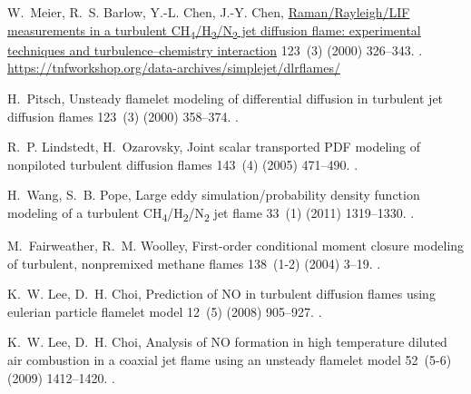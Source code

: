 \documentclass[preprint,12pt, a4paper]{elsarticle}
\begin{document}
\begin{thebibliography}{10}
W.~Meier, R.~S. Barlow, Y.-L. Chen, J.-Y. Chen,
  \href{https://tnfworkshop.org/data-archives/simplejet/dlrflames/}{Raman/{R}ayleigh/{LIF}
  measurements in a turbulent
  {CH}\textsubscript{4}/{H}\textsubscript{2}/{N}\textsubscript{2 }jet diffusion
  flame: experimental techniques and turbulence--chemistry interaction} 123~(3)
  (2000) 326--343.
\newblock \href {http://dx.doi.org/10.1016/S0010-2180(00)00171-1}
  {}.
\newline\urlprefix\url{https://tnfworkshop.org/data-archives/simplejet/dlrflames/}

H.~Pitsch, Unsteady flamelet modeling of differential diffusion in turbulent
  jet diffusion flames 123~(3) (2000) 358--374.
\newblock \href {http://dx.doi.org/10.1016/S0010-2180(00)00135-8}
  {}.

R.~P. Lindstedt, H.~Ozarovsky, Joint scalar transported {PDF} modeling of
  nonpiloted turbulent diffusion flames 143~(4) (2005) 471--490.
\newblock \href {http://dx.doi.org/10.1016/j.combustflame.2005.08.030}
  {}.

H.~Wang, S.~B. Pope, Large eddy simulation/probability density function
  modeling of a turbulent
  {CH}\textsubscript{4}/{H}\textsubscript{2}/{N}\textsubscript{2} jet flame
  33~(1) (2011) 1319--1330.
\newblock \href {http://dx.doi.org/10.1016/j.proci.2010.08.004}
  {}.

M.~Fairweather, R.~M. Woolley, First-order conditional moment closure modeling
  of turbulent, nonpremixed methane flames 138~(1-2) (2004) 3--19.
\newblock \href {http://dx.doi.org/10.1016/j.combustflame.2004.03.001}
  {}.

K.~W. Lee, D.~H. Choi, Prediction of {NO} in turbulent diffusion flames using
  eulerian particle flamelet model 12~(5) (2008) 905--927.
\newblock \href {http://dx.doi.org/10.1080/13647830802094351}
  {}.

K.~W. Lee, D.~H. Choi, Analysis of {NO} formation in high temperature diluted
  air combustion in a coaxial jet flame using an unsteady flamelet model
  52~(5-6) (2009) 1412--1420.
\newblock \href {http://dx.doi.org/10.1016/j.ijheatmasstransfer.2008.08.015}
  {}.

\end{thebibliography}
\end{document}
